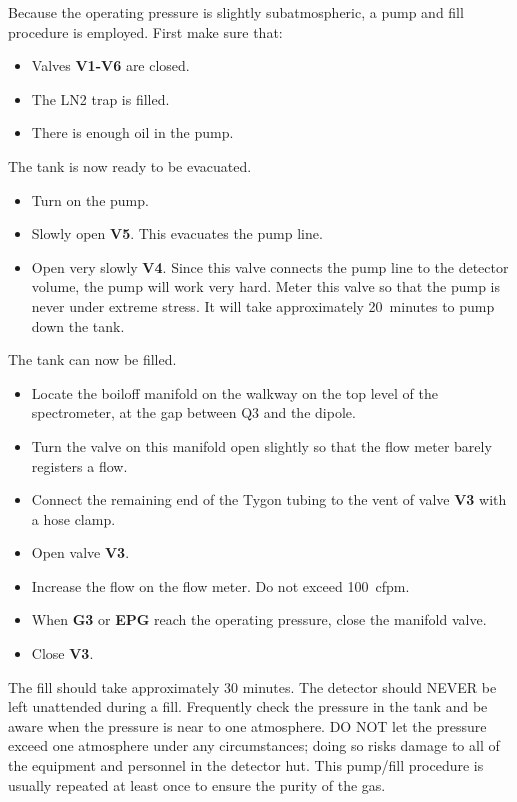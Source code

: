 {Because the operating pressure is slightly subatmospheric, a pump and fill
procedure is employed.  First make sure that:
\begin{itemize}
\item Valves {\bf V1-V6} are closed.
\item The LN2 trap is filled.
\item There is enough oil in the pump.
\end{itemize}
The tank is now ready to be evacuated.
\begin{itemize}
\item Turn on the pump.
\item Slowly open {\bf V5}.  This evacuates the pump line.
\item Open very slowly {\bf V4}.  Since this valve connects the pump line to
the detector volume, the pump will work very hard.  Meter this valve
so that the pump is never under extreme stress.  It will take approximately
20~minutes to pump down the tank.
\end{itemize}
The tank can now be filled.
\begin{itemize}
\item Locate the boiloff manifold on the walkway on the top level of the
spectrometer, at the gap between Q3 and the dipole.
\item Turn the valve on this manifold open slightly so that the flow meter
barely registers a flow.
\item Connect the remaining end of the Tygon tubing to the vent of valve
{\bf V3} with a hose clamp.
\item Open valve {\bf V3}.
\item Increase the flow on the flow meter.  Do not exceed 100~cfpm.
\item When {\bf G3} or {\bf EPG} reach the operating pressure, close
the manifold valve.
\item Close {\bf V3}.
\end{itemize}
The fill should take approximately 30 minutes.  The detector should
NEVER be left unattended during a fill.  Frequently check the pressure
in the tank and be aware when the pressure is near to one atmosphere.
DO NOT let the pressure exceed one atmosphere under any circumstances;
doing so risks damage to all of the equipment and personnel in the
detector hut.  This pump/fill procedure is usually repeated at least
once to ensure the purity of the gas.






}
